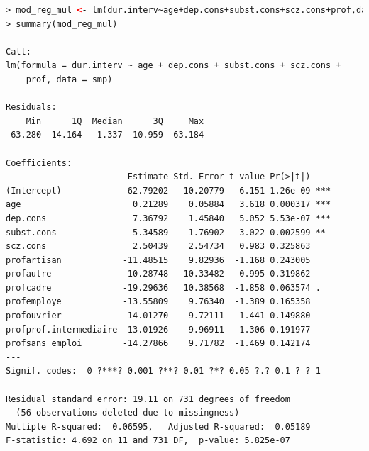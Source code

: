 \begin{lstlisting}[language=html]
> mod_reg_mul <- lm(dur.interv~age+dep.cons+subst.cons+scz.cons+prof,data = smp)
> summary(mod_reg_mul)

Call:
lm(formula = dur.interv ~ age + dep.cons + subst.cons + scz.cons + 
    prof, data = smp)

Residuals:
    Min      1Q  Median      3Q     Max 
-63.280 -14.164  -1.337  10.959  63.184 

Coefficients:
                        Estimate Std. Error t value Pr(>|t|)    
(Intercept)             62.79202   10.20779   6.151 1.26e-09 ***
age                      0.21289    0.05884   3.618 0.000317 ***
dep.cons                 7.36792    1.45840   5.052 5.53e-07 ***
subst.cons               5.34589    1.76902   3.022 0.002599 ** 
scz.cons                 2.50439    2.54734   0.983 0.325863    
profartisan            -11.48515    9.82936  -1.168 0.243005    
profautre              -10.28748   10.33482  -0.995 0.319862    
profcadre              -19.29636   10.38568  -1.858 0.063574 .  
profemploye            -13.55809    9.76340  -1.389 0.165358    
profouvrier            -14.01270    9.72111  -1.441 0.149880    
profprof.intermediaire -13.01926    9.96911  -1.306 0.191977    
profsans emploi        -14.27866    9.71782  -1.469 0.142174    
---
Signif. codes:  0 ?***? 0.001 ?**? 0.01 ?*? 0.05 ?.? 0.1 ? ? 1

Residual standard error: 19.11 on 731 degrees of freedom
  (56 observations deleted due to missingness)
Multiple R-squared:  0.06595,	Adjusted R-squared:  0.05189 
F-statistic: 4.692 on 11 and 731 DF,  p-value: 5.825e-07
\end{lstlisting}

